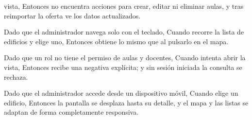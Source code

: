 {      vista, Entonces no encuentra acciones para crear, editar ni eliminar aulas, y tras
      reimportar la oferta ve los datos actualizados.
\item Dado que el administrador navega solo con el teclado, Cuando recorre la lista de
      edificios y elige uno, Entonces obtiene lo mismo que al pulsarlo en el mapa.
\item Dado que un rol no tiene el permiso de aulas y docentes, Cuando intenta abrir la
      vista, Entonces recibe una negativa explícita; y sin sesión iniciada la consulta se
      rechaza.
\item Dado que el administrador accede desde un dispositivo móvil, Cuando elige un
      edificio, Entonces la pantalla se desplaza hasta su detalle, y el mapa y las listas
      se adaptan de forma completamente responsiva.}

\def\HUPruebas{%
\item \texttt{AulasEdificiosTest}: edificios completos con su polígono, sus aulas y sus
      pisos, filtro por facultad y facultad desconocida (criterios 1, 2, 3 y 7).
\item \texttt{AulasEdificiosTest}: aulas en orden natural con edificio y piso, filtro por
      facultad y por estar ubicadas (criterios 4 y 10).
\item \texttt{PeriodosTest}: las facultades llegan en orden de catálogo con su cantidad
      de edificios y de aulas (criterio 2).
\item \texttt{ImportarUbicacionesTest}: edificios y aulas guardados con su ubicación, y
      volver a importar no duplica (criterio 11).
\item \texttt{AulasEdificiosTest} y \texttt{RolesDelSistemaTest}: consulta sin sesión y
      rol sin acceso a una pantalla de administración (criterio 13).
\item \texttt{MapaCampus.test.jsx}, \texttt{FiltroFacultad.test.jsx} y
      \texttt{usarEdificios.test.jsx}: componentes compartidos del mapa, del filtro por
      facultad y de la carga de edificios (criterios 1, 2 y 6).
\item \texttt{Aulas.test.jsx} (por escribir): pestañas, búsqueda, detalle por piso, aula
      marcada, quitar selección, uso con teclado y ausencia de acciones de edición
      (criterios 3 a 9, 11, 12 y 14).}


